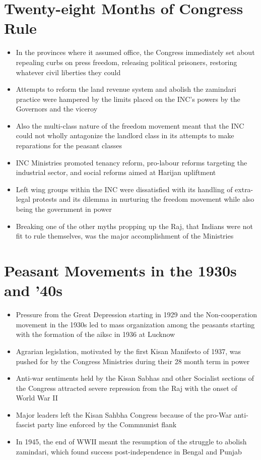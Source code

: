 \section{Twenty-eight Months of Congress Rule}
\begin{itemize}
    \item In the provinces where it assumed office, the Congress immediately set about repealing curbs on press freedom, releasing political prisoners, restoring whatever civil liberties they could
    \item Attempts to reform the land revenue system and abolish the zamindari practice were hampered by the limits placed on the INC's powers by the Governors and the viceroy
    \item Also the multi-class nature of the freedom movement meant that the INC could not wholly antagonize the landlord class in its attempts to make reparations for the peasant classes
    \item INC Ministries promoted tenancy reform, pro-labour reforms targeting the industrial sector, and social reforms aimed at Harijan upliftment
    \item Left wing groups within the INC were dissatisfied with its handling of extra-legal protests and its dilemma in nurturing the freedom movement while also being the government in power
    \item Breaking one of the other myths propping up the Raj, that Indians were not fit to rule themselves, was the major accomplishment of the Ministries
\end{itemize}

\section{Peasant Movements in the 1930s and '40s}
\begin{itemize}
    \item Pressure from the Great Depression starting in 1929 and the Non-cooperation movement in the 1930s led to mass organization among the peasants starting with the formation of the \gls{aiksc} in 1936 at Lucknow
    \item Agrarian legislation, motivated by the first Kisan Manifesto of 1937, was pushed for by the Congress Ministries during their 28 month term in power
    \item Anti-war sentiments held by the Kisan Sabhas and other Socialist sections of the Congress attracted severe repression from the Raj with the onset of World War II
    \item Major leaders left the Kisan Sahbha Congress because of the pro-War anti-fascist party line enforced by the Commnunist flank
    \item In 1945, the end of WWII meant the resumption of the struggle to abolish zamindari, which found success post-independence in Bengal and Punjab
\end{itemize}

